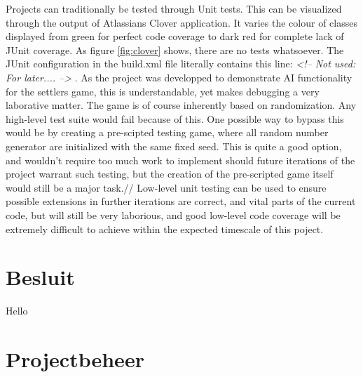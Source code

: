 \documentclass[pdftex12pt, a4paper]{article}
\begin{document}
Projects can traditionally be tested through Unit tests. This can be visualized through the output of Atlassians Clover application. It varies the colour of classes displayed from green for perfect code coverage to dark red for complete lack of JUnit coverage. As figure \ref{fig:clover} shows, there are no tests whatsoever.
The JUnit configuration in the build.xml file literally contains this line: \emph{<!-- Not used: For later.... -->} . As the project was developped to demonstrate AI functionality for the settlers game, this is understandable, yet makes debugging a very laborative matter.
The game is of course inherently based on randomization. Any high-level test suite would fail because of this. One possible way to bypass this would be by creating a pre-scipted testing game, where all random number generator are initialized with the same fixed seed.
This is quite a good option, and wouldn't require too much work to implement should future iterations of the project warrant such testing, but the creation of the pre-scripted game itself would still be a major task.//
Low-level unit testing can be used to ensure possible extensions in further iterations are correct, and vital parts of the current code, but will still be very laborious, and good low-level code coverage will be extremely difficult to achieve within the expected timescale of this poject.

\newpage

\section{Besluit}

Hello 


\newpage

\section{Projectbeheer}
\end{document}
